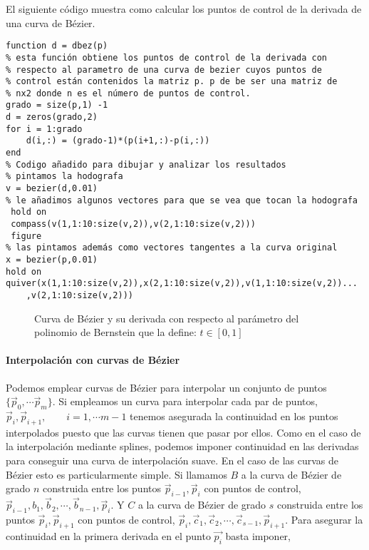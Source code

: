 El siguiente código muestra como calcular los puntos de control de la derivada de una curva de Bézier.
\begin{lstlisting}
function d = dbez(p)
% esta función obtiene los puntos de control de la derivada con 
% respecto al parametro de una curva de bezier cuyos puntos de  
% control están contenidos la matriz p. p de be ser una matriz de 
% nx2 donde n es el número de puntos de control.
grado = size(p,1) -1
d = zeros(grado,2)
for i = 1:grado
    d(i,:) = (grado-1)*(p(i+1,:)-p(i,:))
end
% Codigo añadido para dibujar y analizar los resultados
% pintamos la hodografa
v = bezier(d,0.01)
% le añadimos algunos vectores para que se vea que tocan la hodografa
 hold on
 compass(v(1,1:10:size(v,2)),v(2,1:10:size(v,2)))
 figure
% las pintamos además como vectores tangentes a la curva original
x = bezier(p,0.01)
hold on
quiver(x(1,1:10:size(v,2)),x(2,1:10:size(v,2)),v(1,1:10:size(v,2))...
    ,v(2,1:10:size(v,2)))
\end{lstlisting}

\begin{figure}
\centering
{} \qquad 
{}
\caption{Curva de Bézier y su derivada con respecto al parámetro del polinomio de Bernstein que la define: $t \in [0,1]$} 
\label{fig:bzder}
\end{figure} 

\paragraph{Interpolación con curvas de Bézier} Podemos emplear curvas de Bézier para interpolar un conjunto de puntos $\lbrace \vec{p}_0, \cdots  \vec{p}_m\rbrace$. Si empleamos un curva para interpolar cada par de puntos, $\vec{p}_i, \vec{p}_{i+1}, \qquad i =1, \cdots m-1$ tenemos asegurada la continuidad en los puntos interpolados puesto que las curvas tienen que pasar por ellos. Como en el caso de la interpolación mediante splines, podemos imponer continuidad en las derivadas para conseguir una curva de interpolación suave. En el caso de las curvas de Bézier esto es particularmente simple. Si llamamos $B$ a la curva de Bézier de grado $n$ construida entre los puntos $\vec{p}_{i-1}, \vec{p}_{i}$  con puntos de control, $\vec{p}_{i-1}, b_1, \vec{b}_2,\cdots, \vec{b}_{n-1},\vec{p}_{i}$. Y  $C$ a la curva de Bézier de grado $s$ construida entre los puntos $\vec{p}_{i}, \vec{p}_{i+1}$  con puntos de control, $\vec{p}_{i}, \vec{c}_1, \vec{c}_2,\cdots, \vec{c}_{s-1},\vec{p}_{i+1}$. Para asegurar la continuidad en la primera derivada en el punto $\vec{p_i}$ basta imponer,

